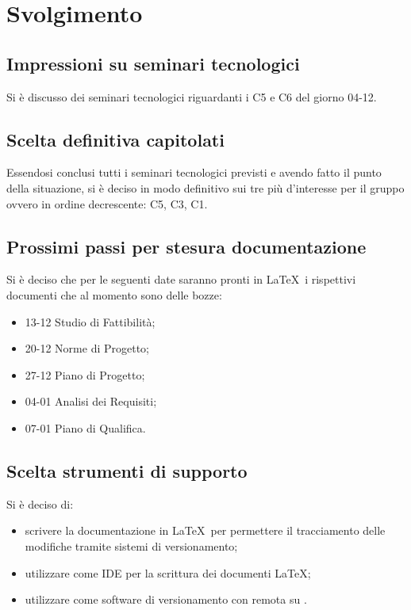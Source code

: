 \documentclass[]{article}
\begin{document}
	\newpage

	\section{Svolgimento}
		\subsection{Impressioni su seminari tecnologici}
		Si è discusso dei seminari tecnologici riguardanti i  C5 e C6 del giorno 04-12.\\

		\subsection{Scelta definitiva capitolati}
		Essendosi conclusi tutti i seminari tecnologici previsti e avendo fatto il punto della situazione, si è deciso in modo definitivo sui tre  più d'interesse per il gruppo ovvero in ordine decrescente: C5, C3, C1.\\

		\subsection{Prossimi passi per stesura documentazione}
		Si è deciso che per le seguenti date saranno pronti in \LaTeX\ i rispettivi documenti che al momento sono delle bozze:
		\begin{itemize}
			\item 13-12 Studio di Fattibilità;
			\item 20-12 Norme di Progetto;
			\item 27-12 Piano di Progetto;
			\item 04-01 Analisi dei Requisiti;
			\item 07-01 Piano di Qualifica.\\
		\end{itemize}

		\subsection{Scelta strumenti di supporto}
		Si è deciso di:
		\begin{itemize}
			\item scrivere la documentazione in \LaTeX\ per permettere il tracciamento delle modifiche tramite sistemi di versionamento;
			\item utilizzare  come IDE per la scrittura dei documenti \LaTeX;
			\item utilizzare  come software di versionamento con  remota su .
		\end{itemize}
\end{document}
